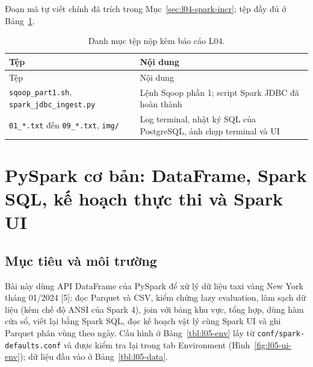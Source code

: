 \documentclass[
  12pt,
  a4paper,
]{report}
\begin{document}
Đoạn mã tự viết chính đã trích trong Mục~\ref{sec:l04-spark-incr}; tệp
đầy đủ ở Bảng~\ref{tbl:l04-files}.

\begin{longtable}[]{@{}
  >{\raggedright\arraybackslash}p{}
  >{\raggedright\arraybackslash}p{}@{}}
\caption{\label{tbl:l04-files}Danh mục tệp nộp kèm báo cáo
L04.}\tabularnewline
\toprule\noalign{}
\begin{minipage}[b]{\linewidth}\raggedright
Tệp
\end{minipage} & \begin{minipage}[b]{\linewidth}\raggedright
Nội dung
\end{minipage} \\
\midrule\noalign{}
\endfirsthead
\toprule\noalign{}
\begin{minipage}[b]{\linewidth}\raggedright
Tệp
\end{minipage} & \begin{minipage}[b]{\linewidth}\raggedright
Nội dung
\end{minipage} \\
\midrule\noalign{}
\endhead
\bottomrule\noalign{}
\endlastfoot
\texttt{sqoop\_part1.sh},
\texttt{spark\_}\allowbreak{}\texttt{jdbc\_}\allowbreak{}\texttt{ingest.}\allowbreak{}\texttt{py}\allowbreak{}
& Lệnh Sqoop phần 1; script Spark JDBC đã hoàn thành \\
\texttt{01\_*.txt} đến \texttt{09\_*.txt}, \texttt{img/} & Log terminal,
nhật ký SQL của PostgreSQL, ảnh chụp terminal và UI \\
\end{longtable}

\chapter{PySpark cơ bản: DataFrame, Spark SQL, kế hoạch thực thi và
Spark UI}\label{sec:l05}

\section{Mục tiêu và môi trường}\label{sec:l05-intro}

Bài này dùng API DataFrame của PySpark để xử lý dữ liệu taxi vàng New
York tháng 01/2024 {[}5{]}: đọc Parquet và CSV, kiểm chứng lazy
evaluation, làm sạch dữ liệu (kèm chế độ ANSI của Spark 4), join với
bảng khu vực, tổng hợp, dùng hàm cửa sổ, viết lại bằng Spark SQL, đọc kế
hoạch vật lý cùng Spark UI và ghi Parquet phân vùng theo ngày. Cấu hình
ở Bảng~\ref{tbl:l05-env} lấy từ
\texttt{conf/}\allowbreak{}\texttt{spark-defaults.}\allowbreak{}\texttt{conf}\allowbreak{}
và được kiểm tra lại trong tab Environment (Hình~\ref{fig:l05-ui-env});
dữ liệu đầu vào ở Bảng~\ref{tbl:l05-data}.
\end{document}
